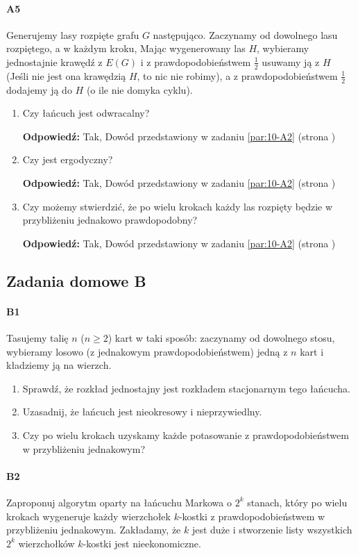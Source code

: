 \documentclass[a4paper,12pt]{article}
\theoremstyle{definition}%
\theoremstyle{definition}
\theoremstyle{problem}
\begin{document}
\paragraph{A5} Generujemy lasy rozpięte grafu $G$ następująco. Zaczynamy od dowolnego lasu rozpiętego, a w każdym kroku, Mając wygenerowany las $H$, wybieramy jednostajnie krawędź z $E(G)$ i z prawdopodobieństwem $\frac{1}{2}$ usuwamy ją z $H$ (Jeśli nie jest ona krawędzią $H$, to nic nie robimy), a z prawdopodobieństwem $\frac{1}{2}$ dodajemy ją do $H$ (o ile nie domyka cyklu).
\begin{enumerate}[label=\alph*)]
\item Czy łańcuch jest odwracalny?

\textbf{Odpowiedź: }Tak, Dowód przedstawiony w zadaniu \ref{par:10-A2} (strona \pageref{par:10-A2})
\item Czy jest ergodyczny?

\textbf{Odpowiedź: }Tak, Dowód przedstawiony w zadaniu \ref{par:10-A2} (strona \pageref{par:10-A2})
\item Czy możemy stwierdzić, że po wielu krokach każdy las rozpięty będzie w przybliżeniu jednakowo prawdopodobny?

\textbf{Odpowiedź: }Tak, Dowód przedstawiony w zadaniu \ref{par:10-A2} (strona \pageref{par:10-A2})
\end{enumerate}

\subsection{Zadania domowe B}
\paragraph{B1} Tasujemy talię $n$ ($n \geq 2$) kart w taki sposób: zaczynamy od dowolnego stosu, wybieramy losowo (z jednakowym prawdopodobieństwem) jedną z $n$ kart i kładziemy ją na wierzch.
\begin{enumerate}[label=\alph*)]
\item Sprawdź, że rozkład jednostajny jest rozkładem stacjonarnym tego łańcucha.
\item Uzasadnij, że łańcuch jest nieokresowy i nieprzywiedlny.
\item Czy po wielu krokach uzyskamy każde potasowanie z prawdopodobieństwem w przybliżeniu jednakowym?
\end{enumerate}

\paragraph{B2} Zaproponuj algorytm oparty na łańcuchu Markowa o $2^k$ stanach, który po wielu krokach wygeneruje każdy wierzchołek $k$-kostki z prawdopodobieństwem w przybliżeniu jednakowym. Zakładamy, że $k$ jest duże i stworzenie listy wszystkich $2^k$ wierzchołków $k$-kostki jest nieekonomiczne.
\end{document}
